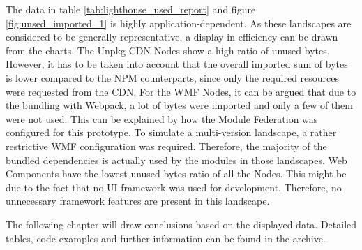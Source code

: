 \normalsize
The data in table \ref{tab:lighthouse_used_report} and figure \ref{fig:unsed_imported_1} is highly application-dependent. 
As these landscapes are considered to be generally representative, a display in efficiency can be drawn from the charts.
The Unpkg CDN Nodes show a high ratio of unused bytes. 
However, it has to be taken into account that the overall imported sum of bytes is lower compared to the NPM counterparts, since only the required resources were requested from the CDN.
For the WMF Nodes, it can be argued that due to the bundling with Webpack, a lot of bytes were imported and only a few of them were not used. 
This can be explained by how the Module Federation was configured for this prototype. 
To simulate a multi-version landscape, a rather restrictive WMF configuration was required. 
Therefore, the majority of the bundled dependencies is actually used by the modules in those landscapes.
Web Components have the lowest unused bytes ratio of all the Nodes. 
This might be due to the fact that no UI framework was used for development. 
Therefore, no unnecessary framework features are present in this landscape.

The following chapter will draw conclusions based on the displayed data. Detailed tables, code examples and further information can be found in the archive.
